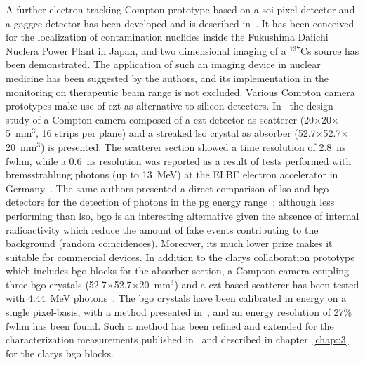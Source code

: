 A further electron-tracking Compton prototype based on a \gls{soi} pixel detector and a \gls{gaggce} detector has been developed and is described in~\cite{Yoshihara2017}. It has been conceived for the localization of contamination nuclides inside the Fukushima Daiichi Nuclera Power Plant in Japan, and two dimensional imaging of a $^{137}$Cs source has been demonstrated. The application of such an imaging device in nuclear medicine has been suggested by the authors, and its implementation in the monitoring on therapeutic beam range is not excluded. 
Various Compton camera prototypes make use of \gls{czt} as alternative to silicon detectors. In~\cite{Kormoll2011} the design study of a Compton camera composed of a \gls{czt} detector as scatterer (20$\times$20$\times$5~mm$^3$, 16 strips per plane) and a streaked \gls{lso} crystal as absorber (52.7$\times$52.7$\times$20~mm$^3$) is presented. The scatterer section showed a time resolution of 2.8~ns \gls{fwhm}, while a 0.6~ns resolution was reported as a result of tests performed with bremsstrahlung photons (up to 13~MeV) at the ELBE electron accelerator in Germany~\parencite{HuesoGonzalez2014}. The same authors presented a direct comparison of \gls{lso} and \gls{bgo} detectors for the detection of photons in the \gls{pg} energy range~\parencite{HuesoGonzalez2015}; although less performing than \gls{lso}, \gls{bgo} is an interesting alternative given the absence of internal radioactivity which reduce the amount of fake events contributing to the background (random coincidences). Moreover, its much lower prize makes it suitable for commercial devices. 
In addition to the \gls{clarys} collaboration prototype which includes \gls{bgo} blocks for the absorber section, a Compton camera coupling three \gls{bgo} crystals (52.7$\times$52.7$\times$20~mm$^3$) and a \gls{czt}-based scatterer has been tested with 4.44~MeV photons~\parencite{Golnik2016}. The \gls{bgo} crystals have been calibrated in energy on a single pixel-basis, with a method presented in~\parencite{HuesoGonzalez2015}, and an energy resolution of 27\% \gls{fwhm} has been found. 
Such a method has been refined and extended for the characterization measurements published in~\parencite{Fontana2018} and described in chapter~\ref{chap::3} for the \gls{clarys} \gls{bgo} blocks. 
